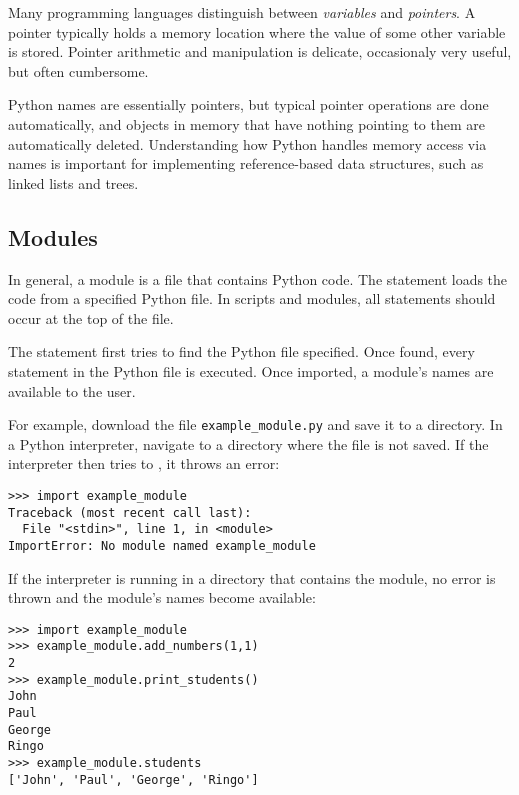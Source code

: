 \begin{info}
Many programming languages distinguish between \emph{variables} and \emph{pointers}.
A pointer typically holds a memory location where the value of some other variable is stored.
Pointer arithmetic and manipulation is delicate, occasionaly very useful, but often cumbersome.

Python names are essentially pointers, but typical pointer operations are done automatically, and objects in memory that have nothing pointing to them are automatically deleted.
Understanding how Python handles memory access via names is important for implementing reference-based data structures, such as linked lists and trees.
\end{info}

\subsection*{Modules}

In general, a module is a file that contains Python code.
The  statement loads the code from a specified Python file.
In scripts and modules, all  statements should occur at the top of the file.

The  statement first tries to find the Python file specified.
Once found, every statement in the Python file is executed.
Once imported, a module's names are available to the user.

For example, download the file \texttt{example\_module.py} and save it to a directory.
In a Python interpreter, navigate to a directory where the file is not saved.
If the interpreter then tries to , it throws an error:

\begin{lstlisting}
>>> import example_module
Traceback (most recent call last):
  File "<stdin>", line 1, in <module>
ImportError: No module named example_module
\end{lstlisting}

If the interpreter is running in a directory that contains the module, no error is thrown and the module's names become available:

\begin{lstlisting}
>>> import example_module
>>> example_module.add_numbers(1,1)
2
>>> example_module.print_students()
John
Paul
George
Ringo
>>> example_module.students
['John', 'Paul', 'George', 'Ringo']
\end{lstlisting}

